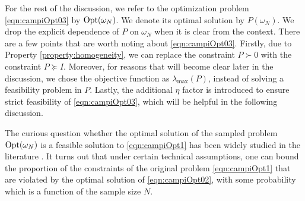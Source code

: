 For the rest of the discussion, we refer to the optimization problem \eqref{eqn:campiOpt03} by $ \text{Opt}(\omega_N)$. We denote its optimal solution by $P(\omega_N)$. We drop the explicit dependence of $P$ on $\omega_N$ when it is clear from the context. There are a few points that are worth noting about \eqref{eqn:campiOpt03}. Firstly, due to Property \ref{property:homogeneity}, we can replace the constraint $P \succ 0$ with the constraint $P \succeq I$. Moreover, for reasons that will become clear later in the discussion, we chose the objective function as $\lambda_{\max}(P)$, instead of solving a feasibility problem in $P$. Lastly, the additional $\eta$ factor is introduced to ensure strict feasibility of \eqref{eqn:campiOpt03}, which will be helpful in the following discussion.

The curious question whether the optimal solution of the sampled problem $\text{Opt}(\omega_N)$ is a feasible solution to \eqref{eqn:campiOpt1} has been widely studied in the literature \cite{campi}. It turns out that under certain technical assumptions, one can bound the proportion of the constraints of the original problem \eqref{eqn:campiOpt1} that are violated by the optimal solution of \eqref{eqn:campiOpt02}, with some probability which is a function of the sample size $N$. 

